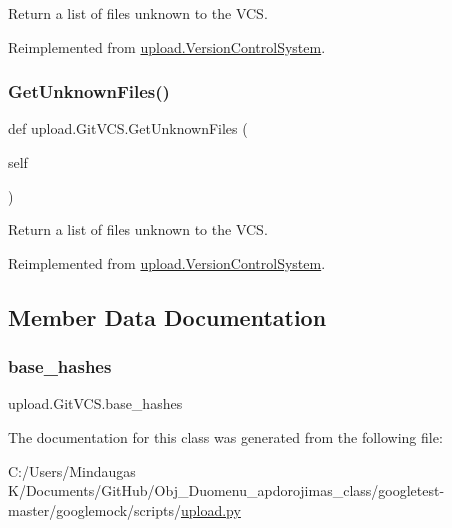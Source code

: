 \begin{DoxyVerb}Return a list of files unknown to the VCS.\end{DoxyVerb}
 

Reimplemented from \mbox{\hyperlink{classupload_1_1_version_control_system_a56a60e56aa9aff3df4001d2f84cab884}{upload.\+Version\+Control\+System}}.

\mbox{\label{classupload_1_1_git_v_c_s_ae4e8c0e9fa01619c6a5c76d1ab84b995}} 
\subsubsection{\texorpdfstring{GetUnknownFiles()}{GetUnknownFiles()}\hspace{0.1cm}{\footnotesize\ttfamily [2/2]}}
{\footnotesize\ttfamily def upload.\+Git\+V\+C\+S.\+Get\+Unknown\+Files (\begin{DoxyParamCaption}\item[{}]{self }\end{DoxyParamCaption})}

\begin{DoxyVerb}Return a list of files unknown to the VCS.\end{DoxyVerb}
 

Reimplemented from \mbox{\hyperlink{classupload_1_1_version_control_system_a56a60e56aa9aff3df4001d2f84cab884}{upload.\+Version\+Control\+System}}.



\subsection{Member Data Documentation}
\mbox{\label{classupload_1_1_git_v_c_s_a07e9469050a157f34fe804cdf6ecddac}} 
\subsubsection{\texorpdfstring{base\_hashes}{base\_hashes}}
{\footnotesize\ttfamily upload.\+Git\+V\+C\+S.\+base\+\_\+hashes}



The documentation for this class was generated from the following file\+:\begin{DoxyCompactItemize}
\item 
C\+:/\+Users/\+Mindaugas K/\+Documents/\+Git\+Hub/\+Obj\+\_\+\+Duomenu\+\_\+apdorojimas\+\_\+class/googletest-\/master/googlemock/scripts/\mbox{\hyperlink{googletest-master_2googlemock_2scripts_2upload_8py}{upload.\+py}}\end{DoxyCompactItemize}
